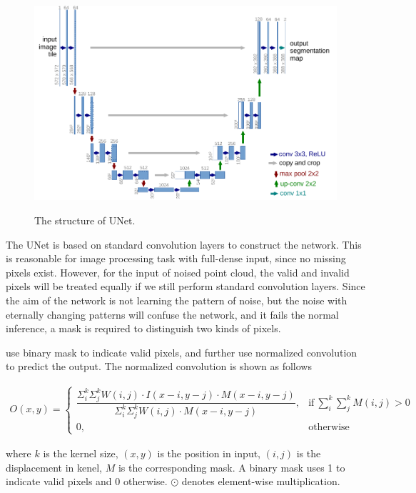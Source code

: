 \documentclass[border=15pt, multi, tikz]{article}
\begin{document}
\begin{figure}[th]
	\centering
	\includegraphics[width=.8\textwidth]{./Figures/u-net-illustration-correct-scale2.pdf}
	\label{fig:u-net}
	\caption{The structure of UNet. \cite{unet}}
\end{figure}


The UNet is based on standard convolution layers to construct the network. This is reasonable for image processing task with full-dense input, since no missing pixels exist. 
However, for the input of noised point cloud, the valid and invalid pixels will be treated equally if we still perform standard convolution layers. Since the aim of the network is not learning the pattern of noise, but the noise with eternally changing patterns will confuse the network, and it fails the normal inference, a mask is required to distinguish two kinds of pixels. 

\cite{pncnn0} use binary mask to indicate valid pixels, and further use normalized convolution to predict the output. The normalized convolution is shown as follows

\begin{equation}
	\begin{array}{rrclcl}
		O(x,y) = 
		\begin{cases}
			\dfrac{\Sigma_i^k\Sigma_j^k W(i,j) \cdot I(x-i,y-j) \cdot M(x-i,y-j)}{\Sigma_i^k\Sigma_j^k W(i,j) \cdot M(x-i,y-j)}, & \text{if}\ \sum_{i}^k\sum_{j}^k M(i,j)>0 \\
			0, & \text{otherwise}
		\end{cases}
	\end{array}
\end{equation}

where $ k $ is the kernel size, $ (x,y) $ is the position in input, $ (i,j) $ is the displacement in kenel, $ M $ is the corresponding mask. A binary mask uses 1 to indicate valid pixels and 0 otherwise. $ \odot $ denotes element-wise multiplication.
\end{document}
